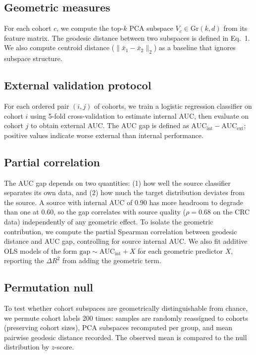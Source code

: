 \documentclass{article}
\begin{document}
\subsection{Geometric measures}

For each cohort $c$, we compute the top-$k$ PCA subspace $V_c \in \mathrm{Gr}(k, d)$ from its feature matrix. The geodesic distance between two subspaces is defined in Eq.~1. We also compute centroid distance ($\|\bar{x}_1 - \bar{x}_2\|_2$) as a baseline that ignores subspace structure.

\subsection{External validation protocol}

For each ordered pair $(i, j)$ of cohorts, we train a logistic regression classifier on cohort $i$ using 5-fold cross-validation to estimate internal AUC, then evaluate on cohort $j$ to obtain external AUC. The AUC gap is defined as $\text{AUC}_{\mathrm{int}} - \text{AUC}_{\mathrm{ext}}$; positive values indicate worse external than internal performance.

\subsection{Partial correlation}

The AUC gap depends on two quantities: (1) how well the source classifier separates its own data, and (2) how much the target distribution deviates from the source. A source with internal AUC of 0.90 has more headroom to degrade than one at 0.60, so the gap correlates with source quality ($\rho = 0.68$ on the CRC data) independently of any geometric effect. To isolate the geometric contribution, we compute the partial Spearman correlation between geodesic distance and AUC gap, controlling for source internal AUC. We also fit additive OLS models of the form $\mathrm{gap} \sim \mathrm{AUC_{int}} + X$ for each geometric predictor $X$, reporting the $\Delta R^2$ from adding the geometric term.

\subsection{Permutation null}

To test whether cohort subspaces are geometrically distinguishable from chance, we permute cohort labels 200 times: samples are randomly reassigned to cohorts (preserving cohort sizes), PCA subspaces recomputed per group, and mean pairwise geodesic distance recorded. The observed mean is compared to the null distribution by $z$-score.
\end{document}
